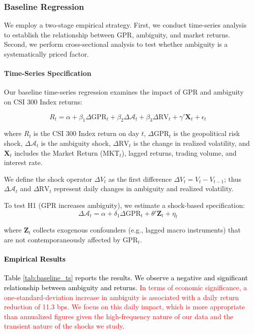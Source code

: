 \documentclass[preprint,12pt,authoryear]{elsarticle}
\begin{document}
\subsubsection{Baseline Regression}

We employ a two-stage empirical strategy. First, we conduct time-series analysis to establish the relationship between GPR, ambiguity, and market returns. Second, we perform cross-sectional analysis to test whether ambiguity is a systematically priced factor.

\paragraph{Time-Series Specification}
Our baseline time-series regression examines the impact of GPR and ambiguity on CSI 300 Index returns:

\begin{equation}
R_{t} = \alpha + \beta_1 \Delta \text{GPR}_{t} + \beta_2 \Delta \mathcal{A}_{t} + \beta_3 \Delta \text{RV}_{t} + \gamma' \mathbf{X}_{t} + \epsilon_{t}
\end{equation}

where $R_t$ is the CSI 300 Index return on day $t$, $\Delta \text{GPR}_t$ is the geopolitical risk shock, $\Delta \mathcal{A}_t$ is the ambiguity shock, $\Delta \text{RV}_t$ is the change in realized volatility, and $\mathbf{X}_t$ includes the Market Return ($\text{MKT}_t$), lagged returns, trading volume, and interest rate.

We define the shock operator $\Delta V_t$ as the first difference $\Delta V_t = V_t - V_{t-1}$; thus $\Delta \mathcal{A}_t$ and $\Delta \text{RV}_t$ represent daily changes in ambiguity and realized volatility.

To test H1 (GPR increases ambiguity), we estimate a shock-based specification:
\begin{equation}
\Delta \mathcal{A}_{t} = \alpha + \delta_1 \Delta \text{GPR}_{t} + \theta' \mathbf{Z}_{t} + \eta_{t}
\end{equation}

where $\mathbf{Z}_t$ collects exogenous confounders (e.g., lagged macro instruments) that are not contemporaneously affected by $\text{GPR}_t$.

\paragraph{\textcolor{black}{Empirical Results}}
\textcolor{black}{Table \ref{tab:baseline_ts} reports the results. We observe a negative and significant relationship between ambiguity and returns.} \textcolor{red}{In terms of economic significance, a one-standard-deviation increase in ambiguity is associated with a daily return reduction of 11.3 bps. We focus on this daily impact, which is more appropriate than annualized figures given the high-frequency nature of our data and the transient nature of the shocks we study.}
\end{document}
